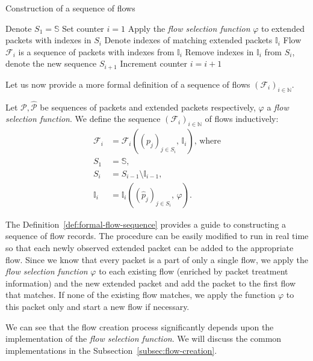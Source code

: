 \begin{algorithm}
    \caption{Construction of a sequence of flows}
    \label{alg:flow-sequence-construction}
    \begin{algorithmic}[1]
        \STATE Denote $S_1 = \mathbb{S}$
        \STATE Set counter $i = 1$
        \REPEAT
			\STATE Apply the \emph{flow selection function} $\varphi$ to extended packets with indexes in $S_i$
			\STATE Denote indexes of matching extended packets $\mathbb{I}_i$
			\STATE Flow $\mathcal{F}_i $ is a sequence of packets with indexes from $\mathbb{I}_i$
			\STATE Remove indexes in $\mathbb{I}_i$ from $S_i$, denote the new sequence $S_{i+1}$
			\STATE Increment counter $i = i + 1$
    \end{algorithmic}
\end{algorithm}

Let us now provide a more formal definition of a sequence of flows $(\mathcal{F}_i)_{i \in \mathbb{N}}$.
\begin{defn}\label{def:formal-flow-sequence}
Let $\mathcal{P}, \widehat{\mathcal{P}}$ be sequences of packets and extended packets respectively, $\varphi$ a \emph{flow selection function}. We define the sequence $(\mathcal{F}_i)_{i \in \mathbb{N}}$ of flows inductively:
\begin{align*}
	\mathcal{F}_i &= \mathcal{F}_i\left((p_j)_{j\in S_i},\, \mathbb{I}_i\right) \text{, where} \\
	S_1 &= \mathbb{S}, \\
	S_i &= S_{i-1} \setminus \mathbb{I}_{i-1}, \\
	\mathbb{I}_{i} &= \mathbb{I}_i\left((\widehat{p}_j)_{j \in S_i},\, \varphi\right).
\end{align*}
\end{defn}

The Definition~\ref{def:formal-flow-sequence} provides a guide to constructing a sequence of flow records. The procedure can be easily modified to run in real time so that each newly observed extended packet can be added to the appropriate flow. Since we know that every packet is a part of only a single flow, we apply the \emph{flow selection function} $\varphi$ to each existing flow (enriched by packet treatment information) and the new extended packet and add the packet to the first flow that matches. If none of the existing flow matches, we apply the function $\varphi$ to this packet only and start a new flow if necessary. 

We can see that the flow creation process significantly depends upon the implementation of the \emph{flow selection function}. We will discuss the common implementations in the Subsection~\ref{subsec:flow-creation}.

